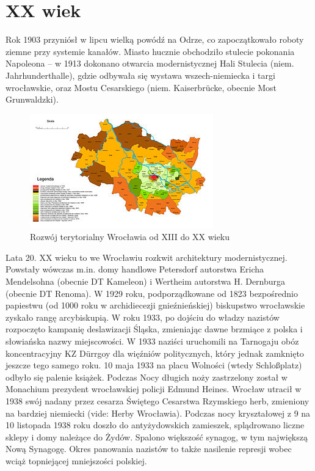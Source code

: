 \documentclass{article}
\begin{document}
\section{XX wiek}
Rok 1903 przyniósł w lipcu wielką powódź na Odrze, co zapoczątkowało roboty ziemne przy systemie kanałów.
\bigskip
\newline
Miasto hucznie obchodziło stulecie pokonania Napoleona – w 1913 dokonano otwarcia modernistycznej Hali Stulecia (niem. Jahrhunderthalle), gdzie odbywała się wystawa wszech-niemiecka i targi wrocławskie, oraz Mostu Cesarskiego (niem. Kaiserbrücke, obecnie Most Grunwaldzki).
\bigskip
\newline
\begin{figure}[h]
\centering
\includegraphics[scale=2]{12.jpg}
\caption{Rozwój terytorialny Wrocławia od XIII do XX wieku}
\end{figure}
\bigskip
\newline
Lata 20. XX wieku to we Wrocławiu rozkwit architektury modernistycznej. Powstały wówczas m.in. domy handlowe Petersdorf autorstwa Ericha Mendelsohna (obecnie DT Kameleon) i Wertheim autorstwa H. Dernburga (obecnie DT Renoma). W 1929 roku, podporządkowane od 1823 bezpośrednio papiestwu (od 1000 roku w archidiecezji gnieźnieńskiej) biskupstwo wrocławskie zyskało rangę arcybiskupią.
\bigskip
\newline
W roku 1933, po dojściu do władzy nazistów rozpoczęto kampanię deslawizacji Śląska, zmieniając dawne brzmiące z polska i słowiańska nazwy miejscowości. W 1933 naziści uruchomili na Tarnogaju obóz koncentracyjny KZ Dürrgoy dla więźniów politycznych, który jednak zamknięto jeszcze tego samego roku. 10 maja 1933 na placu Wolności (wtedy Schloßplatz) odbyło się palenie książek. Podczas Nocy długich noży zastrzelony został w Monachium prezydent wrocławskiej policji Edmund Heines. Wrocław utracił w 1938 swój nadany przez cesarza Świętego Cesarstwa Rzymskiego herb, zmieniony na bardziej niemiecki (vide: Herby Wrocławia). Podczas nocy kryształowej z 9 na 10 listopada 1938 roku doszło do antyżydowskich zamieszek, splądrowano liczne sklepy i domy należące do Żydów. Spalono większość synagog, w tym największą Nową Synagogę.
\bigskip
\newline
Okres panowania nazistów to także nasilenie represji wobec wciąż topniejącej mniejszości polskiej.
\end{document}

